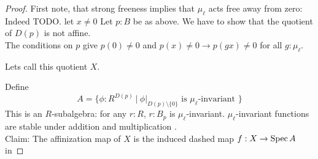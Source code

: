 \begin{proof}
	First note, that strong freeness implies that $\mu_\ell$ acts free away from zero: Indeed TODO. let $x \neq 0$
	Let $p : B$ be as above. We have to show that the quotient of $D(p)$ is not affine. \\
	The conditions on $p$ give $p(0) \neq 0$ and $p(x) \neq 0 \to p(gx) \neq 0$ for all $g : \mu_\ell$.
	
	Lets call this quotient $X$.
	
	Define 
	\[
	A = \{\phi : R^{D(p)} \ | \ \phi|_{D(p) \setminus \{0\}} \text{  is $\mu_{\ell}$-invariant }\}
	\]
	This is an $R$-subalgebra: for any $r : R$, $r : B_p$ is $\mu_{\ell}$-invariant. $\mu_{\ell}$-invariant functions are stable under addition and multiplication . \\
	
	Claim: The affinization map of $X$ is the induced dashed map $f : X \to \operatorname{Spec} A$ in
	

\end{proof}
